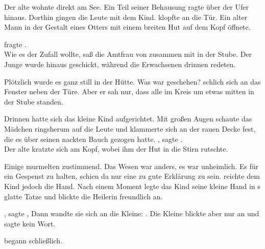 \begin{Large}
Der alte {\Marn} wohnte direkt am See. Ein Teil seiner Behausung ragte über der Ufer hinaus. Dorthin gingen die Leute mit dem Kind. {\Nox} klopfte an die Tür. Ein alter Mann in der Gestalt eines Otters mit einem breiten Hut auf dem Kopf öffnete.

 fragte {\Nox}. \\
Wie es der Zufall wollte, saß die Amtfrau von {\AltBerna} zusammen mit {\Piedo} in der Stube. Der Junge wurde hinaus geschickt, während die Erwachsenen drinnen redeten.

Plötzlich wurde es ganz still in der Hütte. Was war geschehen? {\Piedo} schlich sich an das Fenster neben der Türe. Aber er sah nur, dass alle im Kreis um etwas mitten in der Stube standen.

Drinnen hatte sich das kleine Kind aufgerichtet. Mit großen Augen schaute das Mädchen ringsherum auf die Leute und klammerte sich an der rauen Decke fest, die es über seinen nackten Bauch gezogen hatte. , sagte {\Tea}.\\
Der alte {\Marn} kratzte sich am Kopf, wobei ihm der Hut in die Stirn rutschte. 

Einige murmelten zustimmend. Das Wesen war anders, es war unheimlich. Es für ein Gespenst zu halten, schien da nur eine zu gute Erklärung zu sein. {\Salbana} reichte dem Kind jedoch die Hand. Nach einem Moment legte das Kind seine kleine Hand in {\Salbana}s glatte Tatze und blickte die Heilerin freundlich an.

, sagte {\Salbana},  Dann wandte sie sich an die Kleine: . Die Kleine blickte {\Salbana} aber nur an und sagte kein Wort.

 begann {\Eno} schließlich. 


\end{Large}
